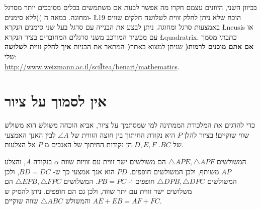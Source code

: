 \documentclass[12pt,a4paper]{article}
\begin{document}
בכיוון השני, היוונים עצמם חקרו מה אפשר לבנות אם משתמשים בכלים מסובכים יותר מסרגל )ללא סימנים( ומחוגה. במאה ה-%
\L{19}
הוכח שלא ניתן לחלק זווית לשלושה חלקים שווים באמצעות סרגל ומחוגה. ניתן לבצע את הבנייה עם סרגל בעל שני סימנים הנקרא
\L{neusis}
או עם מכשיר המורכב משני סרגלים המחוברים בציר הנקרא
\L{quadratrix}.
כתבתי מסמך המתאר את הבניות
\textbf{איך לחלק זווית לשלושה )אם אתם מוכנים לרמות(}
שניתן למצוא באתר שלי:\\
\url{http://www.weizmann.ac.il/sciÎtea/benari/mathematics}.




\section{
אין לסמוך על ציור
}
כדי להדגים את המלכודת הממתינה למי שמסתמך על ציור, אביא הוכחה 
\textbf{}
משולש הוא משולש שווי שוקיים! בציור להלן $P$ היא נקודת החיתוך בין חוצה הזווית של
$\angle A$
 לבין האנך האמצעי של $BC$. $D,E,F$ הן נקודות החיתוך של האנכים מ $P$ אל הצלעות.
 
\begin{center}
\end{center}
המשולשים
$\triangle APE, \triangle APF$
הם משולשים ישר זווית עם זוויות שוות
$\alpha$
בנקודה 
$A$,
והצלע $AP$ משותף, ולכן המשולשים חופפים. $PD$ הוא אנך אמצעי כך ש-%
$BD=DC$,
ולכן המשולשים
$\triangle DPB, \triangle DPC$
חופפים ו-%
$PB=PC$.
המשלושים
$\triangle EPB, \triangle FPC$
הם משלושים ישר זווית עם יתר שווה, ולכן גם הם חופפים. ניתן להסיק ש
$AE+EB=AF+FC$
והמשולש
$\triangle ABC$
שווה שוקיים.
\end{document}
